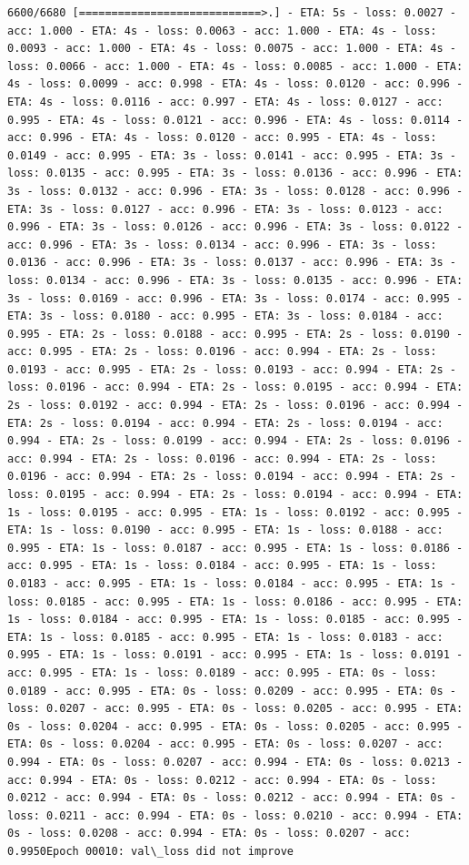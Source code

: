 \documentclass[11pt]{article}
\begin{document}
\begin{Verbatim}[commandchars=\\\{\}]
6600/6680 [============================>.] - ETA: 5s - loss: 0.0027 - acc: 1.000 - ETA: 4s - loss: 0.0063 - acc: 1.000 - ETA: 4s - loss: 0.0093 - acc: 1.000 - ETA: 4s - loss: 0.0075 - acc: 1.000 - ETA: 4s - loss: 0.0066 - acc: 1.000 - ETA: 4s - loss: 0.0085 - acc: 1.000 - ETA: 4s - loss: 0.0099 - acc: 0.998 - ETA: 4s - loss: 0.0120 - acc: 0.996 - ETA: 4s - loss: 0.0116 - acc: 0.997 - ETA: 4s - loss: 0.0127 - acc: 0.995 - ETA: 4s - loss: 0.0121 - acc: 0.996 - ETA: 4s - loss: 0.0114 - acc: 0.996 - ETA: 4s - loss: 0.0120 - acc: 0.995 - ETA: 4s - loss: 0.0149 - acc: 0.995 - ETA: 3s - loss: 0.0141 - acc: 0.995 - ETA: 3s - loss: 0.0135 - acc: 0.995 - ETA: 3s - loss: 0.0136 - acc: 0.996 - ETA: 3s - loss: 0.0132 - acc: 0.996 - ETA: 3s - loss: 0.0128 - acc: 0.996 - ETA: 3s - loss: 0.0127 - acc: 0.996 - ETA: 3s - loss: 0.0123 - acc: 0.996 - ETA: 3s - loss: 0.0126 - acc: 0.996 - ETA: 3s - loss: 0.0122 - acc: 0.996 - ETA: 3s - loss: 0.0134 - acc: 0.996 - ETA: 3s - loss: 0.0136 - acc: 0.996 - ETA: 3s - loss: 0.0137 - acc: 0.996 - ETA: 3s - loss: 0.0134 - acc: 0.996 - ETA: 3s - loss: 0.0135 - acc: 0.996 - ETA: 3s - loss: 0.0169 - acc: 0.996 - ETA: 3s - loss: 0.0174 - acc: 0.995 - ETA: 3s - loss: 0.0180 - acc: 0.995 - ETA: 3s - loss: 0.0184 - acc: 0.995 - ETA: 2s - loss: 0.0188 - acc: 0.995 - ETA: 2s - loss: 0.0190 - acc: 0.995 - ETA: 2s - loss: 0.0196 - acc: 0.994 - ETA: 2s - loss: 0.0193 - acc: 0.995 - ETA: 2s - loss: 0.0193 - acc: 0.994 - ETA: 2s - loss: 0.0196 - acc: 0.994 - ETA: 2s - loss: 0.0195 - acc: 0.994 - ETA: 2s - loss: 0.0192 - acc: 0.994 - ETA: 2s - loss: 0.0196 - acc: 0.994 - ETA: 2s - loss: 0.0194 - acc: 0.994 - ETA: 2s - loss: 0.0194 - acc: 0.994 - ETA: 2s - loss: 0.0199 - acc: 0.994 - ETA: 2s - loss: 0.0196 - acc: 0.994 - ETA: 2s - loss: 0.0196 - acc: 0.994 - ETA: 2s - loss: 0.0196 - acc: 0.994 - ETA: 2s - loss: 0.0194 - acc: 0.994 - ETA: 2s - loss: 0.0195 - acc: 0.994 - ETA: 2s - loss: 0.0194 - acc: 0.994 - ETA: 1s - loss: 0.0195 - acc: 0.995 - ETA: 1s - loss: 0.0192 - acc: 0.995 - ETA: 1s - loss: 0.0190 - acc: 0.995 - ETA: 1s - loss: 0.0188 - acc: 0.995 - ETA: 1s - loss: 0.0187 - acc: 0.995 - ETA: 1s - loss: 0.0186 - acc: 0.995 - ETA: 1s - loss: 0.0184 - acc: 0.995 - ETA: 1s - loss: 0.0183 - acc: 0.995 - ETA: 1s - loss: 0.0184 - acc: 0.995 - ETA: 1s - loss: 0.0185 - acc: 0.995 - ETA: 1s - loss: 0.0186 - acc: 0.995 - ETA: 1s - loss: 0.0184 - acc: 0.995 - ETA: 1s - loss: 0.0185 - acc: 0.995 - ETA: 1s - loss: 0.0185 - acc: 0.995 - ETA: 1s - loss: 0.0183 - acc: 0.995 - ETA: 1s - loss: 0.0191 - acc: 0.995 - ETA: 1s - loss: 0.0191 - acc: 0.995 - ETA: 1s - loss: 0.0189 - acc: 0.995 - ETA: 0s - loss: 0.0189 - acc: 0.995 - ETA: 0s - loss: 0.0209 - acc: 0.995 - ETA: 0s - loss: 0.0207 - acc: 0.995 - ETA: 0s - loss: 0.0205 - acc: 0.995 - ETA: 0s - loss: 0.0204 - acc: 0.995 - ETA: 0s - loss: 0.0205 - acc: 0.995 - ETA: 0s - loss: 0.0204 - acc: 0.995 - ETA: 0s - loss: 0.0207 - acc: 0.994 - ETA: 0s - loss: 0.0207 - acc: 0.994 - ETA: 0s - loss: 0.0213 - acc: 0.994 - ETA: 0s - loss: 0.0212 - acc: 0.994 - ETA: 0s - loss: 0.0212 - acc: 0.994 - ETA: 0s - loss: 0.0212 - acc: 0.994 - ETA: 0s - loss: 0.0211 - acc: 0.994 - ETA: 0s - loss: 0.0210 - acc: 0.994 - ETA: 0s - loss: 0.0208 - acc: 0.994 - ETA: 0s - loss: 0.0207 - acc: 0.9950Epoch 00010: val\_loss did not improve

\end{Verbatim}
\end{document}
